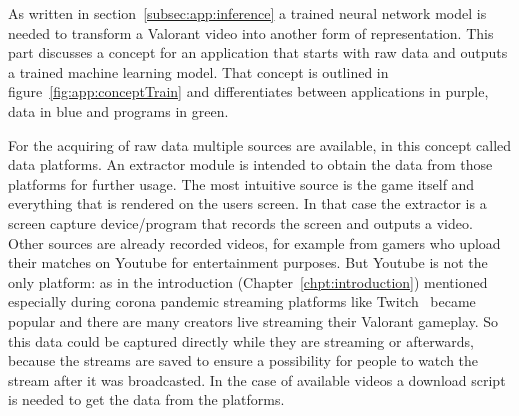 As written in section~\ref{subsec:app:inference} a trained neural network model is needed to 
transform a Valorant video into another form of representation. This part discusses a concept for an 
application that starts with raw data and outputs a trained machine learning model. That concept is 
outlined in figure~\ref{fig:app:conceptTrain} and differentiates between applications in purple, data 
in blue and programs in green.

For the acquiring of raw data multiple sources are available, in this concept called data platforms. 
An extractor module is intended to obtain the data from those platforms for further usage.
The most intuitive source is the game itself and everything that is rendered on the users screen. In 
that case the extractor is a screen capture device/program that records the screen and outputs a 
video. Other sources are already recorded videos, for example from gamers who upload their 
matches on Youtube for entertainment purposes. But Youtube is not the only platform: as in the 
introduction (Chapter~\ref{chpt:introduction}) mentioned especially during corona pandemic 
streaming platforms like Twitch~\cite{twitch} became popular and there are many creators live 
streaming their Valorant gameplay. So this data could be captured directly while they are streaming 
or afterwards, because the streams are saved to ensure a possibility for people to watch the stream 
after it was broadcasted. In the case of available videos a download script is needed to get the data 
from the platforms.

